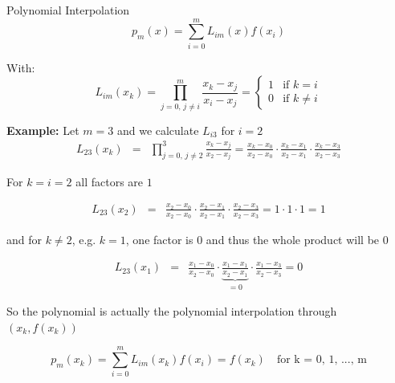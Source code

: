 \begin{vbframe}{Polynomial Interpolation}
$$
p_m(x) = \sum_{i = 0}^m L_{im}(x)f(x_{i})
$$

\framebreak


\begin{footnotesize}
With:
\vspace*{-0.6cm}
$$
L_{im}(x_k) = \prod_{j = 0,\, j \not= i}^m \frac{x_k - x_{j}}{x_{i} - x_{j}} = \begin{cases}
 1 & \text{if } k = i \\
 0 & \text{if } k \neq i
\end{cases}
$$
\end{footnotesize}

\begin{footnotesize}
\textbf{Example:} Let $m = 3$ and we calculate $L_{i3}$ for $i = 2$
\begin{eqnarray*}
L_{23}(x_k) &=& \prod_{j = 0,\, j \not= 2}^3 \frac{x_k - x_{j}}{x_2 - x_{j}} = \frac{x_k - x_0}{x_2 - x_0} \cdot \frac{x_k - x_1}{x_2 - x_1} \cdot \frac{x_k - x_3}{x_2 - x_3}
\end{eqnarray*}

For $k = i = 2$ all factors are $1$

\vspace*{-0.3cm}
\begin{eqnarray*}
L_{23}(x_2) &=& \frac{x_2 - x_0}{x_2 - x_0} \cdot \frac{x_2 - x_1}{x_2 - x_1} \cdot \frac{x_2 - x_3}{x_2 - x_3} = 1 \cdot 1 \cdot 1 = 1
\end{eqnarray*}

and for $k \ne 2$, e.g. $k = 1$, one factor is $0$ and thus the whole product will be $0$

\begin{eqnarray*}
L_{23}(x_1) &=& \frac{x_1 - x_0}{x_2 - x_0} \cdot \underbrace{\frac{x_1 - x_1}{x_2 - x_1}}_{= 0} \cdot \frac{x_1 - x_3}{x_2 - x_3} = 0
\end{eqnarray*}

\end{footnotesize}


\begin{footnotesize}
So the polynomial is actually the polynomial interpolation through $(x_k, f(x_k))$

\vspace*{-0.3cm}

$$
p_{m}(x_k) = \sum_{i = 0}^m L_{im}(x_k)%
f(x_i) = f(x_k) \quad \text{for k = 0, 1, ..., m}
$$
\end{footnotesize}




%
%


\end{vbframe}

